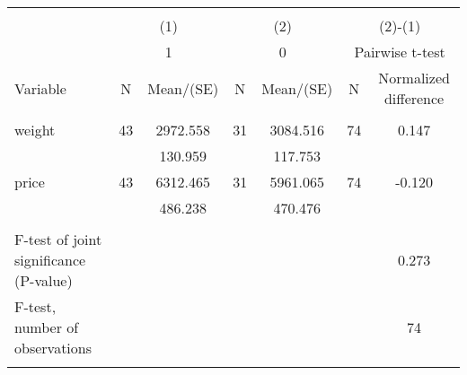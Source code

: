 
\begin{tabular}{@{\extracolsep{5pt}}lcccccc}
\\[-1.8ex]\hline \hline \\[-1.8ex]
 & \multicolumn{2}{c}{(1)}  & \multicolumn{2}{c}{(2)}  & \multicolumn{2}{c}{(2)-(1)} \\
 & \multicolumn{2}{c}{1}  & \multicolumn{2}{c}{0}  & \multicolumn{2}{c}{Pairwise t-test}  \\
Variable & N & Mean/(SE) & N & Mean/(SE) & N & Normalized difference \\ \hline \\[-1.8ex] 
weight   & 43    &  2972.558    & 31    &  3084.516    & 74    &     0.147   \\
 &   &   130.959  &   &   117.753  &   &   \\
price   & 43    &  6312.465    & 31    &  5961.065    & 74    &    -0.120   \\
 &   &   486.238  &   &   470.476  &   &   \\
\hline \\[-1.8ex]
F-test of joint significance (P-value) & &   & &     & &      0.273   \\
F-test, number of observations & &   & &   & &  74   \\
\hline \\[-1.8ex]

\end{tabular}
